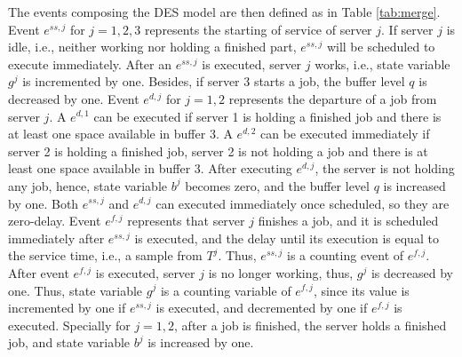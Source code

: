 \documentclass[]{interact}
\theoremstyle{plain}%
\theoremstyle{definition}
\theoremstyle{remark}
\begin{document}
The events composing the DES model are then defined as in Table \ref{tab:merge}. Event $e^{ss,j}$ for $j=1,2,3$ represents the starting of service of server $j$. If server $j$ is idle, i.e., neither working nor holding a finished part, $e^{ss,j}$ will be scheduled to execute immediately. After an $e^{ss,j}$ is executed, server $j$ works, i.e., state variable $g^j$ is incremented by one. Besides, if server 3 starts a job, the buffer level $q$ is decreased by one. Event $e^{d,j}$ for $j=1,2$ represents the departure of a job from server $j$. A $e^{d,1}$ can be executed if server 1 is holding a finished job and there is at least one space available in buffer 3. A $e^{d,2}$ can be executed immediately if server 2 is holding a finished job, server 2 is not holding a job and there is at least one space available in buffer 3. After executing $e^{d,j}$, the server is not holding any job, hence, state variable $b^{j}$ becomes zero, and the buffer level $q$ is increased by one. Both $e^{ss,j}$ and $e^{d,j}$ can executed immediately once scheduled, so they are zero-delay. Event $e^{f,j}$ represents that server $j$ finishes a job, and it is scheduled immediately after $e^{ss,j}$ is executed, and the delay until its execution is equal to the service time, i.e., a sample from $T^{j}$. Thus, $e^{ss,j}$ is a counting event of $e^{f,j}$. After event $e^{f,j}$ is executed, server $j$ is no longer working, thus, $g^j$ is decreased by one. Thus, state variable $g^j$ is a counting variable of $e^{f,j}$, since its value is incremented by one if $e^{ss,j}$ is executed, and decremented by one if  $e^{f,j}$ is executed. Specially for $j=1,2$, after a job is finished, the server holds a finished job, and state variable $b^j$ is increased by one. %
\end{document}
